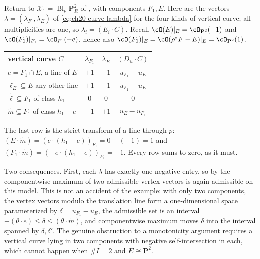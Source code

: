\begin{example}
\label{ex:ch20-max-fails-naively}
Return to $\mathcal X_1=\operatorname{Bl}_p\mathbf P^2_R$ of
, with components $F_1,E$.  Here are the
vectors $\lambda=(\lambda_{F_1},\lambda_E)$ of
\eqref{eq:ch20-curve-lambda} for the four kinds of vertical curve; all
multiplicities are one, so $\lambda_i=(E_i\cdot C)$.  Recall
$\cO(E)|_E=\cO_{\mathbf P^2}(-1)$ and
$\cO(F_1)|_{F_1}=\cO_{F_1}(-e)$, hence also
$\cO(F_1)|_E=\cO(\rho^*F-E)|_E=\cO_{\mathbf P^2}(1)$.

\begin{center}
\small
\begin{tabular}{p{}|c|c|c}
\toprule
\textbf{vertical curve $C$}&$\lambda_{F_1}$&$\lambda_E$
 &$(D_u\cdot C)$\\
\midrule
$e=F_1\cap E$, a line of $E$&$+1$&$-1$&$u_{F_1}-u_E$\\
$\ell_E\subseteq E$ any other line&$+1$&$-1$&$u_{F_1}-u_E$\\
$\tilde\ell\subseteq F_1$ of class $h_1$&$0$&$0$&$0$\\
$\tilde m\subseteq F_1$ of class $h_1-e$&$-1$&$+1$&$u_E-u_{F_1}$\\
\bottomrule
\end{tabular}
\end{center}

The last row is the strict transform of a line through $p$:
$(E\cdot\tilde m)=(e\cdot(h_1-e))_{F_1}=0-(-1)=1$ and
$(F_1\cdot\tilde m)=(-e\cdot(h_1-e))_{F_1}=-1$.  Every row sums to zero,
as it must.

Two consequences.  First, each $\lambda$ has exactly one negative entry,
so by  the componentwise maximum of two
admissible vertex vectors is again admissible on this model.  This is not an
accident of the example: with only two components, the vertex vectors modulo
the translation line form a one-dimensional space parameterized by
$\delta=u_{F_1}-u_E$, the admissible set is an interval
$-(\theta\cdot e)\le\delta\le(\theta\cdot\tilde m)$, and componentwise
maximum moves $\delta$ into the interval spanned by $\delta,\delta'$.
The genuine obstruction to a monotonicity argument requires a vertical curve
lying in two components with negative self-intersection in each, which
cannot happen when $\#I=2$ and $E\cong\mathbf P^2$.


\end{example}
